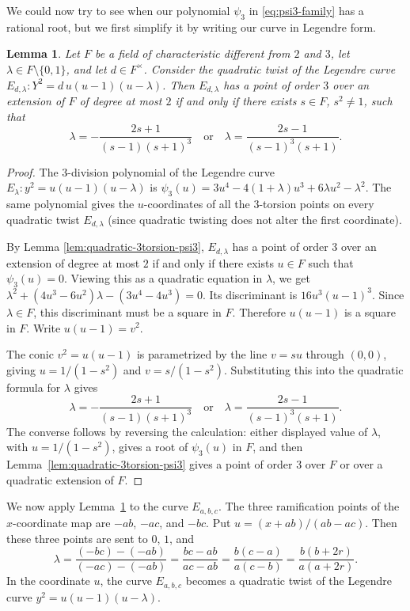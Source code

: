 \documentclass{article}
\theoremstyle{plain}
\newtheorem{lemma}[theorem]{Lemma}
\begin{document}
We could now try to see when our polynomial \(\psi_3\) in \eqref{eq:psi3-family} has a rational root, but we first simplify it by writing our curve in Legendre form.

\begin{lemma}\label{lem:legendre-quad-3torsion}
Let \(F\) be a field of characteristic different from \(2\) and \(3\), let
\(\lambda\in F\setminus\{0,1\}\), and let \(d\in F^\times\). Consider the
quadratic twist of the Legendre curve
\(E_{d,\lambda}: Y^2=d\,u(u-1)(u-\lambda)\). Then \(E_{d,\lambda}\) has a
point of order \(3\) over an extension of \(F\) of degree at most \(2\) if and
only if there exists \(s\in F\), \(s^2\neq 1\), such that
\[
\lambda = -\frac{2s+1}{(s-1)(s+1)^3}
\quad\text{or}\quad
\lambda = \frac{2s-1}{(s-1)^3(s+1)}.
\]
\end{lemma}

\begin{proof}
The \(3\)-division polynomial of the Legendre curve
\(E_\lambda: y^2=u(u-1)(u-\lambda)\) is
\(\psi_3(u)=3u^4-4(1+\lambda)u^3+6\lambda u^2-\lambda^2\). The same polynomial
gives the \(u\)-coordinates of all the \(3\)-torsion points on every
quadratic twist \(E_{d,\lambda}\) (since quadratic twisting does not alter the first coordinate).

By Lemma \ref{lem:quadratic-3torsion-psi3}, \(E_{d,\lambda}\) has a point of
order \(3\) over an extension of degree at most \(2\) if and only if
there exists \(u\in F\) such that \(\psi_3(u)=0\). Viewing this as a
quadratic equation in \(\lambda\), we get
\(\lambda^2+(4u^3-6u^2)\lambda-(3u^4-4u^3)=0\). Its discriminant is
\(16u^3(u-1)^3\). Since \(\lambda\in F\), this discriminant must be a square in
\(F\). Therefore \(u(u-1)\) is a square in \(F\). Write \(u(u-1)=v^2\).

The conic \(v^2=u(u-1)\) is parametrized by the line \(v=su\) through
\((0,0)\), giving \(u=1/(1-s^2)\) and \(v=s/(1-s^2)\). Substituting this into
the quadratic formula for \(\lambda\) gives
\[
\lambda = -\frac{2s+1}{(s-1)(s+1)^3}
\quad\text{or}\quad
\lambda = \frac{2s-1}{(s-1)^3(s+1)}.
\]
The converse follows by reversing the calculation: either displayed value of
\(\lambda\), with \(u=1/(1-s^2)\), gives a root of \(\psi_3(u)\) in \(F\), and
then Lemma~\ref{lem:quadratic-3torsion-psi3} gives a point of order \(3\) over
\(F\) or over a quadratic extension of \(F\).
\end{proof}

We now apply Lemma~\ref{lem:legendre-quad-3torsion} to the curve
\(E_{a,b,c}\). The three ramification points of the \(x\)-coordinate map are
\(-ab\), \(-ac\), and \(-bc\). Put
\(u=(x+ab)/(ab-ac)\). Then these three points are sent to \(0\), \(1\), and
\begin{equation}
\label{eq:lambda-family}
\lambda
=
\frac{(-bc)-(-ab)}{(-ac)-(-ab)}
=
\frac{bc-ab}{ac-ab}
=
\frac{b(c-a)}{a(c-b)}
=
\frac{b(b+2r)}{a(a+2r)}.
\end{equation}
In the coordinate \(u\), the curve \(E_{a,b,c}\) becomes a quadratic twist of
the Legendre curve \(y^2=u(u-1)(u-\lambda)\).
\end{document}
